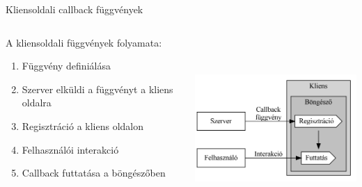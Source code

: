 \documentclass[english, aspectratio=169]{beamer}
\begin{document}
\begin{frame}{Kliensoldali callback függvények}
	\begin{columns}
		\begin{column}{.5\textwidth}
			A kliensoldali függvények folyamata: 
			\begin{enumerate}
				\item Függvény definiálása
				\item Szerver elküldi a függvényt a kliens oldalra
				\item Regisztráció a kliens oldalon 
				\item Felhasználói interakció
				\item Callback futtatása a böngészőben
			\end{enumerate}
		\end{column}
		\begin{column}{.5\textwidth}
			\begin{center}
				\includegraphics[width=7cm, height=7cm, keepaspectratio]{graphs/adv_2.png}
			\end{center}	
		\end{column}
	\end{columns}
\end{frame}
\end{document}
